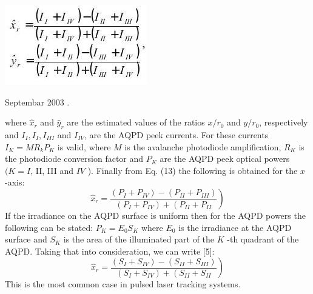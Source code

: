 \documentclass[10pt]{article}
\begin{document}
\includegraphics[max width=\textwidth]{d2750892714501b765cfde22b041f38a-03}

Septembar 2003 .

where \(\hat{x}_{r}\) and \(\hat{y}_{r}\) are the estimated values of the ratios \(x / r_{0}\) and \(y / r_{0}\), respectively and \(I_{I}, I_{I}, I_{I I I}\) and \(I_{I V}\), are the AQPD peek currents. For these currents \(I_{K}=M R_{k} P_{K}\) is valid, where \(M\) is the avalanche photodiode amplification, \(R_{K}\) is the photodiode conversion factor and \(P_{K}\) are the AQPD peek optical powers \((K=I\), II, III and \(I V\) ). Finally from Eq. (13) the following is obtained for the \(x\) -axis:
\[
\left.\hat{x}_{r}=\frac{\left(P_{I}+P_{I V}\right)-\left(P_{I I}+P_{I I I}\right)}{\left(P_{I}+P_{I V}\right)+\left(P_{I I}+P_{I I}\right.}\right)
\]
If the irradiance on the AQPD surface is uniform then for the AQPD powers the following can be stated: \(P_{K}=E_{0} S_{K}\) where \(E_{0}\) is the irradiance at the AQPD surface and \(S_{K}\) is the area of the illuminated part of the \(K\) -th quadrant of the AQPD. Taking that into consideration, we can write [5]:
\[
\left.\hat{x}_{r}=\frac{\left(S_{I}+S_{I V}\right)-\left(S_{I I}+S_{I I I}\right)}{\left(S_{I}+S_{I V}\right)+\left(S_{I I}+S_{I I}\right.}\right)
\]
This is the most common case in pulsed laser tracking systems.
\end{document}
